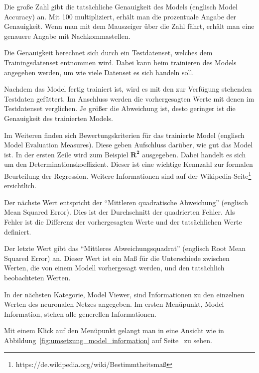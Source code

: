 Die große Zahl gibt die tatsächliche Genauigkeit des Models (englisch Model Accuracy) an. Mit 100 multipliziert, erhält
man die prozentuale Angabe der Genauigkeit. Wenn man mit dem Mauszeiger über die Zahl fährt, erhält man eine genauere
Angabe mit Nachkommastellen.

Die Genauigkeit berechnet sich durch ein Testdatenset, welches dem Trainingsdatenset entnommen wird. Dabei kann beim
trainieren des Models angegeben werden, um wie viele Datenset es sich handeln soll.

Nachdem das Model fertig trainiert ist, wird es mit den zur Verfügung stehenden Testdaten gefüttert. Im Anschluss werden
die vorhergesagten Werte mit denen im Testdatenset verglichen. Je größer die Abweichung ist, desto geringer ist die
Genauigkeit des trainierten Models.

Im Weiteren finden sich Bewertungskriterien für das trainierte Model (englisch Model Evaluation Measures). Diese geben
Aufschluss darüber, wie gut das Model ist. In der ersten Zeile wird zum Beispiel $\mathbf{R^2}$ ausgegeben.  Dabei
handelt es sich um den Determinationskoeffizient. Dieser ist eine wichtige Kennzahl zur formalen Beurteilung der
Regression. Weitere Informationen sind auf der Wikipedia-Seite\footnote{https://de.wikipedia.org/wiki/Bestimmtheitsmaß}
ersichtlich.

Der nächste Wert entspricht der \enquote{Mittleren quadratische Abweichung} (englisch Mean Squared Error). Dies ist der
Durchschnitt der quadrierten Fehler. Als Fehler ist die Differenz der vorhergesagten Werte und der tatsächlichen Werte
definiert.

Der letzte Wert gibt das \enquote{Mittleres Abweichungsquadrat} (englisch Root Mean Squared Error) an. Dieser Wert ist
ein Maß für die Unterschiede zwischen Werten, die von einem Modell vorhergesagt werden, und den tatsächlich beobachteten
Werten.

In der nächsten Kategorie, Model Viewer, sind Informationen zu den einzelnen Werten des neuronalen Netzes angegeben.
Im ersten Menüpunkt, Model Information, stehen alle generellen Informationen.

Mit einem Klick auf den Menüpunkt gelangt man in eine Ansicht wie in Abbildung~\ref{fig:umsetzung_model_information}
auf Seite~\pageref{fig:umsetzung_model_information} zu sehen.

